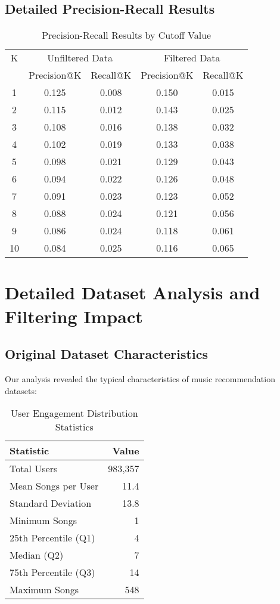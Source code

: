 \documentclass[12pt,a4paper]{article}
\begin{document}
\subsection{Detailed Precision-Recall Results}

\begin{table}[H]
\centering
\caption{Precision-Recall Results by Cutoff Value}
\begin{tabular}{ccccc}
\toprule
K & \multicolumn{2}{c}{Unfiltered Data} & \multicolumn{2}{c}{Filtered Data} \\
\cmidrule(lr){2-3} \cmidrule(lr){4-5}
& Precision@K & Recall@K & Precision@K & Recall@K \\
\midrule
1 & 0.125 & 0.008 & 0.150 & 0.015 \\
2 & 0.115 & 0.012 & 0.143 & 0.025 \\
3 & 0.108 & 0.016 & 0.138 & 0.032 \\
4 & 0.102 & 0.019 & 0.133 & 0.038 \\
5 & 0.098 & 0.021 & 0.129 & 0.043 \\
6 & 0.094 & 0.022 & 0.126 & 0.048 \\
7 & 0.091 & 0.023 & 0.123 & 0.052 \\
8 & 0.088 & 0.024 & 0.121 & 0.056 \\
9 & 0.086 & 0.024 & 0.118 & 0.061 \\
10 & 0.084 & 0.025 & 0.116 & 0.065 \\
\bottomrule
\end{tabular}
\end{table}

\section{Detailed Dataset Analysis and Filtering Impact}

\subsection{Original Dataset Characteristics}

Our analysis revealed the typical characteristics of music recommendation datasets:

\begin{table}[H]
\centering
\caption{User Engagement Distribution Statistics}
\begin{tabular}{lr}
\toprule
Statistic & Value \\
\midrule
Total Users & 983,357 \\
Mean Songs per User & 11.4 \\
Standard Deviation & 13.8 \\
Minimum Songs & 1 \\
25th Percentile (Q1) & 4 \\
Median (Q2) & 7 \\
75th Percentile (Q3) & 14 \\
Maximum Songs & 548 \\
\bottomrule
\end{tabular}
\end{table}
\end{document}

